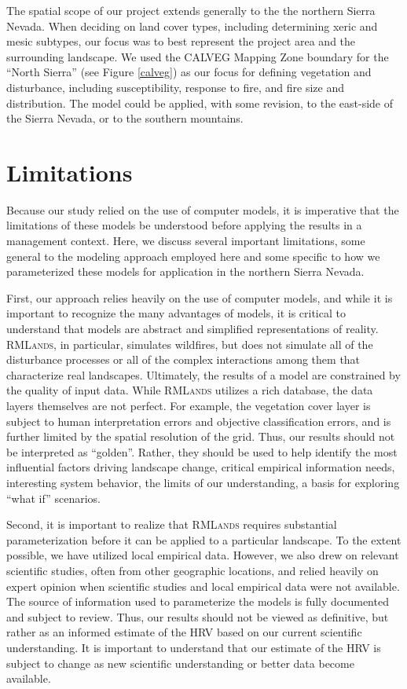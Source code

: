 The spatial scope of our project extends generally to the the northern Sierra Nevada. When deciding on land cover types, including determining xeric and mesic subtypes, our focus was to best represent the project area and the surrounding landscape. We used the CALVEG Mapping Zone boundary for the ``North Sierra'' (see Figure \ref{calveg}) as our focus for defining vegetation and disturbance, including susceptibility, response to fire, and fire size and distribution. The model could be applied, with some revision, to the east-side of the Sierra Nevada, or to the southern mountains.

\section{Limitations}

Because our study relied on the use of computer models, it is imperative that the limitations of these models be understood before applying the results in a management context. Here, we discuss several important limitations, some general to the modeling approach employed here and some specific to how we parameterized these models for application in the northern Sierra Nevada.

First, our approach relies heavily on the use of computer models, and while it is important to recognize the many advantages of models, it is critical to understand that models are abstract and simplified representations of reality. \textsc{RMLands}, in particular, simulates wildfires, but does not simulate all of the disturbance processes or all of the complex interactions among them that characterize real landscapes. Ultimately, the results of a model are constrained by the quality of input data. While \textsc{RMLands} utilizes a rich database, the data layers themselves are not perfect. For example, the vegetation cover layer is subject to human interpretation errors and objective classification errors, and is further limited by the spatial resolution of the grid. Thus, our results should not be interpreted as ``golden''. Rather, they should be used to help identify the most influential factors driving landscape change, critical empirical information needs, interesting system behavior, the limits of our understanding, a basis for exploring “what if” scenarios.

Second, it is important to realize that \textsc{RMLands} requires substantial parameterization before it can be applied to a particular landscape. To the extent possible, we have utilized local empirical data. However, we also drew on relevant scientific studies, often from other geographic locations, and relied heavily on expert opinion when scientific studies and local empirical data were not available. The source of information used to parameterize the models is fully documented and subject to review. Thus, our results should not be viewed as definitive, but rather as an informed estimate of the HRV based on our current scientific understanding. It is important to understand that our estimate of the HRV is subject to change as new scientific understanding or better data become available.

